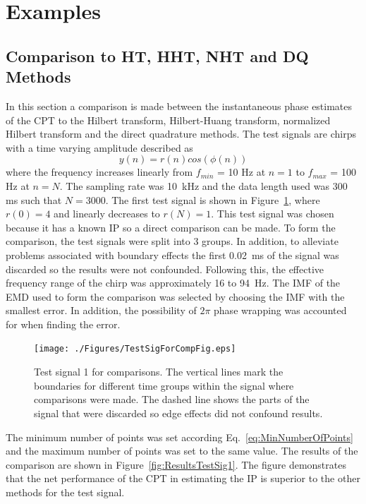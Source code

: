 \documentclass[journal,11pt,a4paper,onecolumn,draftcls]{IEEEtran}
\begin{document}
\section{Examples}
\subsection{Comparison to HT, HHT, NHT and DQ Methods}
In this section a comparison is made between the instantaneous phase estimates of the CPT to the Hilbert transform, Hilbert-Huang transform, normalized Hilbert transform and the direct quadrature methods. The test signals are chirps with a time varying amplitude described as
\begin{equation}\label{TestSigNoNoise}
    y(n)=r\left(n\right)cos\left(\phi\left(n\right)\right)
\end{equation}
where the frequency increases linearly from $f_{min}$ = 10 Hz at $n=1$ to $f_{max}$ = 100 Hz at $n=N$. The sampling rate was 10~kHz and the data length used was 300 ms such that $N = 3000$. The first test signal is shown in Figure~\ref{fig:TestSig1}, where $r(0) = 4$ and linearly decreases to $r(N) = 1$. This test signal was chosen because it has a known IP so a direct comparison can be made. To form the comparison, the test signals were split into 3 groups. In addition, to alleviate problems associated with boundary effects the first 0.02~ms of the signal was discarded so the results were not confounded. Following this, the effective frequency range of the chirp was approximately 16 to 94~Hz. The IMF of the EMD used to form the comparison was selected by choosing the IMF with the smallest error. In addition, the possibility of $2\pi$ phase wrapping was accounted for when finding the error.

\begin{figure}[htbp]
	\centering
		\texttt{[image: ./Figures/TestSigForCompFig.eps]}
	\caption{Test signal 1 for comparisons. The vertical lines mark the boundaries for different time groups within the signal where comparisons were made. The dashed line shows the parts of the signal that were discarded so edge effects did not confound results.}
	\label{fig:TestSig1}
\end{figure}

The minimum number of points was set according Eq.~\ref{eq:MinNumberOfPoints} and the maximum number of points was set to the same value. The results of the comparison are shown in Figure~\ref{fig:ResultsTestSig1}. The figure demonstrates that the net performance of the CPT in estimating the IP is superior to the other methods for the test signal.
\end{document}
